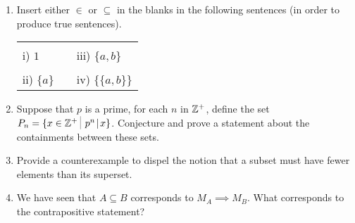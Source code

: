 \begin{enumerate}
\item Insert either $\in$ or $\subseteq$ in the blanks in the following 
sentences (in order to produce true sentences).


\begin{tabular}{lcl}
\rule{0pt}{16pt}i) $1$ \underline{\rule{36pt}{0pt}} $\{3, 2, 1, \{a, b\}\}$ & \rule{36pt}{0pt} & iii) $\{a, b\}$  \underline{\rule{36pt}{0pt}} $\{3, 2, 1, \{a, b\}\}$ \\
\rule{0pt}{16pt}ii) $\{a\}$ \underline{\rule{36pt}{0pt}} $\{a, \{a, b\}\}$ & &
iv) $\{\{a, b\}\}$  \underline{\rule{36pt}{0pt}} $\{a, \{a, b\}\}$ \\
\end{tabular}

\hint{$\in$, $\subseteq$, $\in$, $\subseteq$}

\item  Suppose that $p$ is a prime, for each $n$ in ${\mathbb Z}^+$, 
define the set $P_n = \{ x \in \Integers^+ \suchthat \, p^n \divides x \}$.  
Conjecture and prove a statement about the containments between these sets.


\wbvfill

\item  Provide a counterexample to dispel the notion that a subset must
have fewer elements than its superset.


\wbvfill

\workbookpagebreak

\item  We have seen that $A \subseteq B$ corresponds to $M_A \implies M_B$.
What corresponds to the contrapositive statement?

 
\wbvfill

\hintspagebreak


\end{enumerate}
